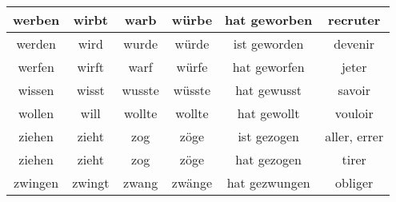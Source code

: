 \documentclass{article}
\begin{document}
\begin{center}
\begin{longtable}{|c|c|c|c|c|c|}
\\
	\hline
	werben &  wirbt &  warb &  würbe &  hat geworben & recruter
\\
	\hline
	werden &  wird &  wurde &  würde &  ist geworden & devenir
\\
	\hline
	werfen &  wirft &  warf &  würfe &  hat geworfen & jeter
\\
	\hline
	wissen &  wisst &  wusste &  wüsste &  hat gewusst & savoir
\\
	\hline
	wollen &  will &  wollte &  wollte &  hat gewollt & vouloir
\\
	\hline
	ziehen &  zieht &  zog &  zöge &  ist gezogen & aller, errer
\\
	\hline
	ziehen &  zieht &  zog &  zöge &  hat gezogen & tirer
\\
	\hline
	zwingen &  zwingt &  zwang &  zwänge &  hat gezwungen & obliger
\\
	\hline
\end{longtable}
\end{center}
\end{document}
